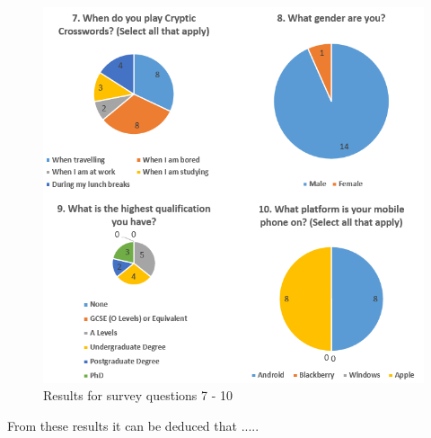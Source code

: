 \begin{figure}[H]
\begin{center}
\includegraphics[keepaspectratio=true]
	{problem_analysis/graphs_7_10.png}
\caption{Results for survey questions 7 - 10}
\end{center}
\end{figure}



From these results it can be deduced that .....

